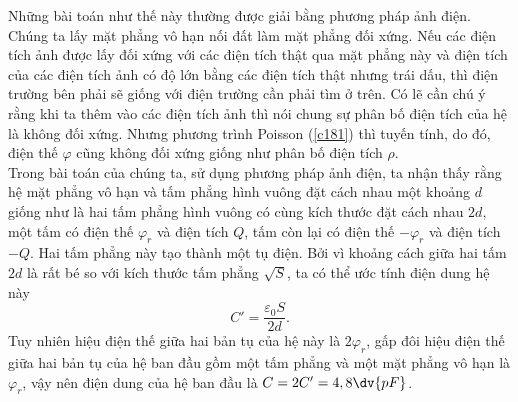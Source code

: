 \begin{loigiai}
\begin{minipage}{0.3\textwidth}
    \end{minipage}
     Những bài toán như thế này thường được giải bằng phương pháp ảnh điện. Chúng ta lấy mặt phẳng vô hạn nối đất làm mặt phẳng đối xứng. Nếu các điện tích ảnh được lấy đối xứng với các điện tích thật qua mặt phẳng này và điện tích của các điện tích ảnh có độ lớn bằng các điện tích thật nhưng trái dấu, thì điện trường bên phải sẽ giống với điện trường cần phải tìm ở trên. Có lẽ cần chú ý rằng khi ta thêm vào các điện tích ảnh thì nói chung sự phân bố điện tích của hệ là không đối xứng. Nhưng phương trình Poisson (\ref{c181}) thì tuyến tính, do đó, điện thế $\varphi$ cũng không đối xứng giống như phân bố điện tích $\rho$.\\
    Trong bài toán của chúng ta, sử dụng phương pháp ảnh điện, ta nhận thấy rằng hệ mặt phẳng vô hạn và tấm phẳng hình vuông đặt cách nhau một khoảng $d$ giống như là hai tấm phẳng hình vuông có cùng kích thước đặt cách nhau $2d$, một tấm có điện thế $\varphi_r$ và điện tích $Q$, tấm còn lại có điện thế $-\varphi_r$ và điện tích $-Q$. Hai tấm phẳng này tạo thành một tụ điện. Bởi vì khoảng cách giữa hai tấm $2d$ là rất bé so với kích thước tấm phẳng $\sqrt{S}$, ta có thể ước tính điện dung hệ này 
    $$C'=\dfrac{\varepsilon_0S}{2d}.$$
    Tuy nhiên hiệu điện thế giữa hai bản tụ của hệ này là $2\varphi_r$, gấp đôi hiệu điện thế giữa hai bản tụ của hệ ban đầu gồm một tấm phẳng và một mặt phẳng vô hạn là $\varphi_r$, vậy nên điện dung của hệ ban đầu là $C=2C'=4,8\dv{pF}$.
    \end{loigiai}
    
